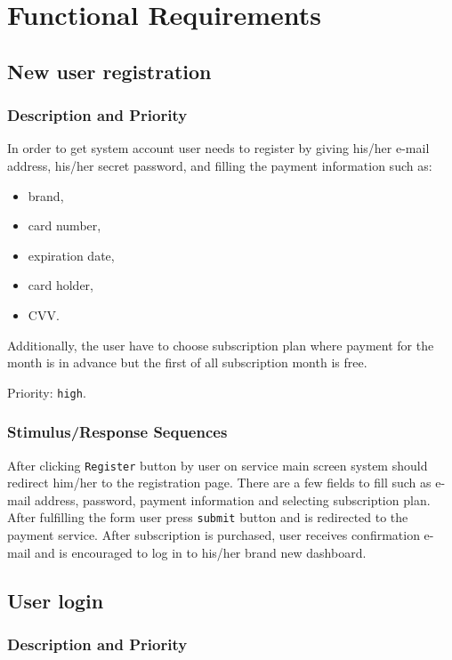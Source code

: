 \documentclass{scrreprt}
\begin{document}
\chapter{Functional Requirements}

\section{New user registration}

\subsection{Description and Priority}

In order to get system account user needs to register by giving his/her e-mail address, his/her secret password, and filling the payment information such as: 
\begin{itemize}
\item brand,
\item card number,
\item expiration date,
\item card holder,
\item CVV.
\end{itemize}

Additionally, the user have to choose subscription plan where payment for the month is in advance but the first of all subscription month is free.

Priority: \verb|high|.

\subsection{Stimulus/Response Sequences}

After clicking \verb|Register| button by user on service main screen system should redirect him/her to the registration page. There are a few fields to fill such as e-mail address, password,  payment information and selecting subscription plan. After fulfilling the form user press \verb|submit| button and is redirected to the payment service. After subscription is purchased, user receives confirmation e-mail and is encouraged to log in to his/her brand new dashboard.

\section{User login}

\subsection{Description and Priority}
\end{document}
